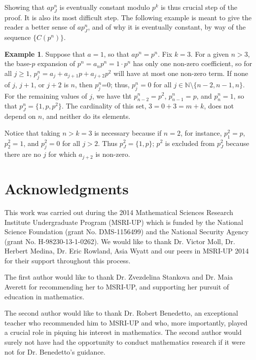\documentclass[12pt, letter]{article}    %
\theoremstyle{plain}
\theoremstyle{definition}
\newtheorem{example}[theorem]{Example}
\numberwithin{equation}{section}
\begin{document}
Showing that $ap^n_J$ is eventually constant modulo $p^k$ is thus crucial step of the proof. It is also its most difficult step. The following example is meant to give the reader a better sense of $ap^n_J$, and of why it is eventually constant, by way of the sequence $\{C(p^n)\}$.

\begin{example} Suppose that $a=1$, so that $ap^n=p^n$. Fix $k=3$. For a given $n>3$, the base-$p$ expansion of $p^n=a_np^n=1\cdot p^n$ has only one non-zero coefficient, so for all $j\geq 1$, $p^n_j=a_j+a_{j+1}p+a_{j+2}p^2$ will have at most one non-zero term. If none of $j$, $j+1$, or $j+2$ is $n$, then $p^n_j$=0; thus, $p^n_j=0$ for all $j\in\mathbb{N}\setminus\{n-2,n-1,n\}$. For the remaining values of $j$, we have tht $p^n_{n-2}=p^2$, $p^n_{n-1}=p$, and $p^n_n=1$, so that $p^n_J=\{1,p,p^2\}$. The cardinality of this set, $3=0+3=m+k$, does not depend on $n$, and neither do its elements.

Notice that taking $n>k=3$ is necessary because if $n=2$, for instance, $p^2_1=p$, $p^2_2=1$, and $p^2_j=0$ for all  $j>2$. Thus $p^2_J=\{1,p\}$; $p^2$ is excluded from $p^2_J$ because there are no $j$ for which $a_{j+2}$ is non-zero.
\end{example}

\section{Acknowledgments}
This work was carried out during the 2014 Mathematical Sciences Research Institute Undergraduate
Program (MSRI-UP) which is funded by the National Science Foundation 
(grant No. DMS-1156499) and the National Security Agency (grant No. H-98230-13-1-0262). 
We would like to thank Dr. Victor Moll, Dr. Herbert Medina, Dr. Eric Rowland, Asia Wyatt and our peers in MSRI-UP 2014 for their support throughout this process. 

The first author would like to thank Dr. Zvezdelina Stankova and Dr. Maia Averett for recommending her to MSRI-UP, and supporting her pursuit of education in mathematics.

The second author would like to thank Dr. Robert Benedetto, an exceptional teacher who recommended him to MSRI-UP and who, more importantly, played a crucial role in piquing his interest in mathematics. The second author would surely not have had the opportunity to conduct mathematics research if it were not for Dr. Benedetto's guidance.
\end{document}
